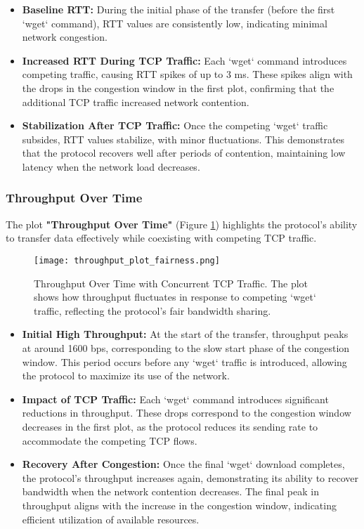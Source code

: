 \documentclass[11pt]{article}
\begin{document}
\begin{itemize}
    \item \textbf{Baseline RTT:} During the initial phase of the transfer (before the first `wget` command), RTT values are consistently low, indicating minimal network congestion.
    
    \item \textbf{Increased RTT During TCP Traffic:} Each `wget` command introduces competing traffic, causing RTT spikes of up to 3 ms. These spikes align with the drops in the congestion window in the first plot, confirming that the additional TCP traffic increased network contention.
    
    \item \textbf{Stabilization After TCP Traffic:} Once the competing `wget` traffic subsides, RTT values stabilize, with minor fluctuations. This demonstrates that the protocol recovers well after periods of contention, maintaining low latency when the network load decreases.
\end{itemize}

\subsubsection{Throughput Over Time}

The plot \textbf{"Throughput Over Time"} (Figure \ref{fig:throughput_fairness}) highlights the protocol's ability to transfer data effectively while coexisting with competing TCP traffic.

\begin{figure}[H]
    \centering
    \texttt{[image: throughput\_plot\_fairness.png]}
    \caption{Throughput Over Time with Concurrent TCP Traffic. The plot shows how throughput fluctuates in response to competing `wget` traffic, reflecting the protocol's fair bandwidth sharing.}
    \label{fig:throughput_fairness}
\end{figure}

\begin{itemize}
    \item \textbf{Initial High Throughput:} At the start of the transfer, throughput peaks at around 1600 bps, corresponding to the slow start phase of the congestion window. This period occurs before any `wget` traffic is introduced, allowing the protocol to maximize its use of the network.
    
    \item \textbf{Impact of TCP Traffic:} Each `wget` command introduces significant reductions in throughput. These drops correspond to the congestion window decreases in the first plot, as the protocol reduces its sending rate to accommodate the competing TCP flows.
    
    \item \textbf{Recovery After Congestion:} Once the final `wget` download completes, the protocol’s throughput increases again, demonstrating its ability to recover bandwidth when the network contention decreases. The final peak in throughput aligns with the increase in the congestion window, indicating efficient utilization of available resources.
\end{itemize}
\end{document}
